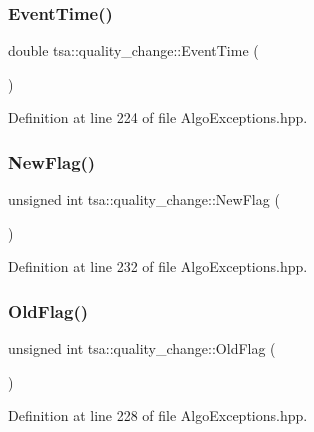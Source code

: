 \subsubsection{\texorpdfstring{Event\+Time()}{EventTime()}}
{\footnotesize\ttfamily double tsa\+::quality\+\_\+change\+::\+Event\+Time (\begin{DoxyParamCaption}{ }\end{DoxyParamCaption})\hspace{0.3cm}{\ttfamily [inline]}}



Definition at line 224 of file Algo\+Exceptions.\+hpp.

\mbox{\label{classtsa_1_1quality__change_a6de5d5aea1cf03c5d4d2d69014d78d2d}} 
\subsubsection{\texorpdfstring{New\+Flag()}{NewFlag()}}
{\footnotesize\ttfamily unsigned int tsa\+::quality\+\_\+change\+::\+New\+Flag (\begin{DoxyParamCaption}{ }\end{DoxyParamCaption})\hspace{0.3cm}{\ttfamily [inline]}}



Definition at line 232 of file Algo\+Exceptions.\+hpp.

\mbox{\label{classtsa_1_1quality__change_af1f74fabce5ad05c2088a7e99a68cb6a}} 
\subsubsection{\texorpdfstring{Old\+Flag()}{OldFlag()}}
{\footnotesize\ttfamily unsigned int tsa\+::quality\+\_\+change\+::\+Old\+Flag (\begin{DoxyParamCaption}{ }\end{DoxyParamCaption})\hspace{0.3cm}{\ttfamily [inline]}}



Definition at line 228 of file Algo\+Exceptions.\+hpp.



